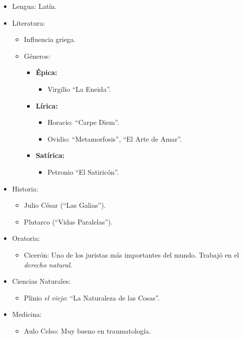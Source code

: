 \begin{itemize}

\item Lengua: Latín.

\item Literatura:
\begin{itemize}
	\item Influencia griega.
	\item Géneros:
		\begin{itemize}
			\item \textbf{Épica:}
				\begin{itemize}
					\item Virgilio ``La Eneida''.
				\end{itemize}
			\item \textbf{Lírica:}
				\begin{itemize}
					\item Horacio: ``Carpe Diem''.
					\item Ovidio: ``Metamorfosis'', ``El Arte de Amar''.
				\end{itemize}
			\item \textbf{Satírica:}
				\begin{itemize}
					\item Petronio ``El Satiricón''.
				\end{itemize}
		\end{itemize}
\end{itemize}

\item Historia:
\begin{itemize}
	\item Julio César (``Las Galias'').
	\item Plutarco (``Vidas Paralelas'').
\end{itemize}

\item Oratoria:
\begin{itemize}
	\item Cicerón: Uno de los juristas más importantes del mundo. Trabajó en el \emph{derecho natural}.
\end{itemize}

\item Ciencias Naturales:
\begin{itemize}
	\item Plinio \emph{el viejo}: ``La Naturaleza de las Cosas''.
\end{itemize}

\item Medicina:
\begin{itemize}
	\item Aulo Celso: Muy bueno en traumatología.
\end{itemize}


\end{itemize}
